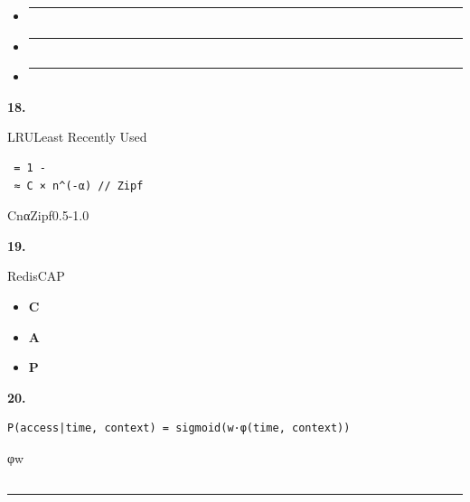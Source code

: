 \begin{itemize}
\item
  \begin{center}\rule{0.5\linewidth}{0.5pt}\end{center}
\item
  \begin{center}\rule{0.5\linewidth}{0.5pt}\end{center}
\item
  \begin{center}\rule{0.5\linewidth}{0.5pt}\end{center}
\end{itemize}

\textbf{18. }

LRULeast Recently Used

\begin{verbatim}
 = 1 - 
 ≈ C × n^(-α) // Zipf
\end{verbatim}

CnαZipf0.5-1.0

\textbf{19. }

RedisCAP

\begin{itemize}
\tightlist
\item
  \textbf{C}
\item
  \textbf{A}\\
\item
  \textbf{P}
\end{itemize}

\textbf{20. }

\begin{verbatim}
P(access|time, context) = sigmoid(w·φ(time, context))
\end{verbatim}

φw

\subsection{}\label{section-43}

\begin{center}\rule{0.5\linewidth}{0.5pt}\end{center}

